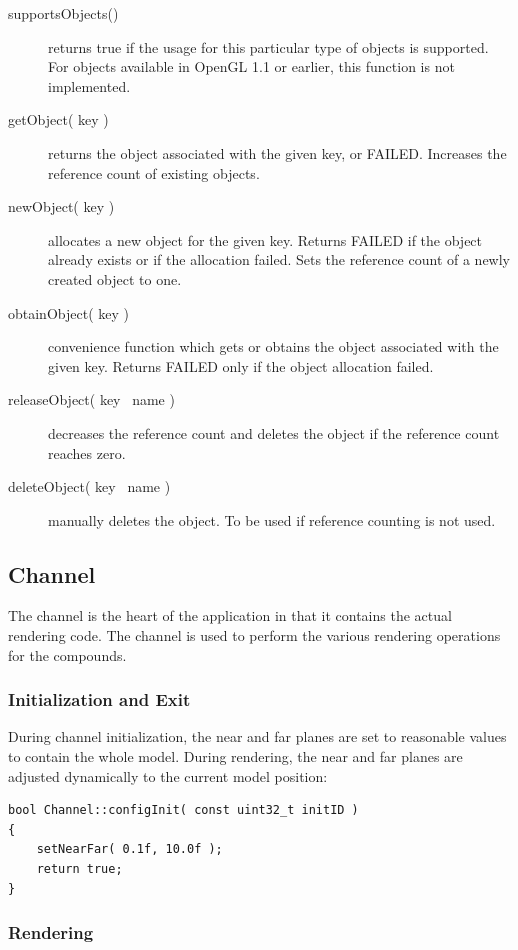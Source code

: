 \documentclass[10pt,a4]{scrartcl}
\begin{document}
\begin{description}
\item[supportsObjects()] returns true if the usage for this particular
  type of objects is supported. For objects available in OpenGL 1.1 or
  earlier, this function is not implemented.
\item[getObject( key )] returns the object associated with the given
  key, or FAILED. Increases the reference count of existing objects.
\item[newObject( key )] allocates a new object for the given
  key. Returns FAILED if the object already exists or if the allocation
  failed. Sets the reference count of a newly created object to one.
\item[obtainObject( key )] convenience function which gets or obtains
  the object associated with the given key. Returns FAILED only if the
  object allocation failed.
\item[releaseObject( key \textbar\ name )] decreases the reference count and
  deletes the object if the reference count reaches zero.
\item[deleteObject( key \textbar\ name )] manually deletes the object. To be
  used if reference counting is not used.
\end{description}


\subsection{Channel}

The channel is the heart of the application in that it contains the
actual rendering code. The channel is used to perform the various rendering
operations for the compounds.

\subsubsection{Initialization and Exit}

During channel initialization, the near and far planes are set to
reasonable values to contain the whole model. During rendering, the near
and far planes are adjusted dynamically to the current model position:

{\footnotesize\begin{lstlisting}
bool Channel::configInit( const uint32_t initID )
{
    setNearFar( 0.1f, 10.0f );
    return true;
}
\end{lstlisting}}

\subsubsection{Rendering}
\end{document}
